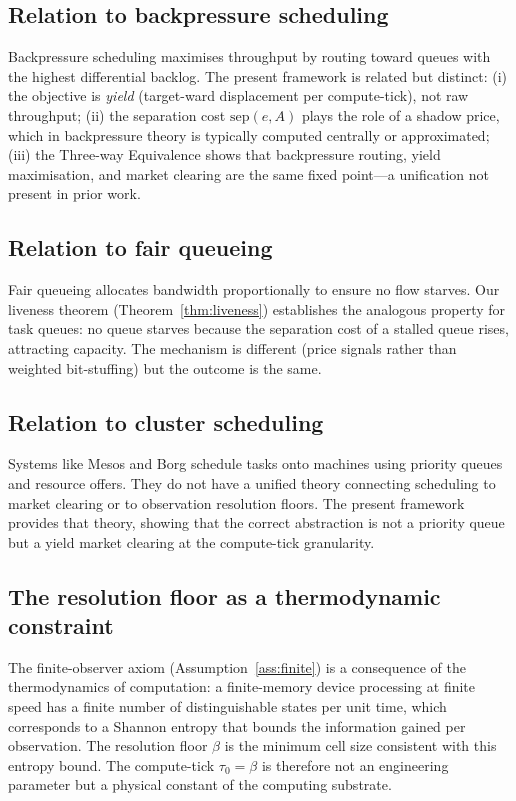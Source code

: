 \documentclass[11pt,twocolumn,a4paper]{article}
\theoremstyle{plain}
\theoremstyle{definition}
\theoremstyle{remark}
\newcommand{\tick}{\tau_0}
\newcommand{\sep}{\mathrm{sep}}
\newcommand{\floor}{\beta}
\begin{document}
\subsection{Relation to backpressure scheduling}

Backpressure scheduling \cite{tassiulas1992,neely2010} maximises throughput by routing toward queues with the highest differential backlog. The present framework is related but distinct: (i) the objective is \emph{yield} (target-ward displacement per compute-tick), not raw throughput; (ii) the separation cost $\sep(e, A)$ plays the role of a shadow price, which in backpressure theory is typically computed centrally or approximated; (iii) the Three-way Equivalence shows that backpressure routing, yield maximisation, and market clearing are the same fixed point---a unification not present in prior work.

\subsection{Relation to fair queueing}

Fair queueing \cite{demers1990} allocates bandwidth proportionally to ensure no flow starves. Our liveness theorem (Theorem~\ref{thm:liveness}) establishes the analogous property for task queues: no queue starves because the separation cost of a stalled queue rises, attracting capacity. The mechanism is different (price signals rather than weighted bit-stuffing) but the outcome is the same.

\subsection{Relation to cluster scheduling}

Systems like Mesos \cite{hindman2011} and Borg \cite{verma2015} schedule tasks onto machines using priority queues and resource offers. They do not have a unified theory connecting scheduling to market clearing or to observation resolution floors. The present framework provides that theory, showing that the correct abstraction is not a priority queue but a yield market clearing at the compute-tick granularity.

\subsection{The resolution floor as a thermodynamic constraint}

The finite-observer axiom (Assumption~\ref{ass:finite}) is a consequence of the thermodynamics of computation: a finite-memory device processing at finite speed has a finite number of distinguishable states per unit time, which corresponds to a Shannon entropy \cite{shannon1948} that bounds the information gained per observation. The resolution floor $\floor$ is the minimum cell size consistent with this entropy bound. The compute-tick $\tick = \floor$ is therefore not an engineering parameter but a physical constant of the computing substrate.
\end{document}
